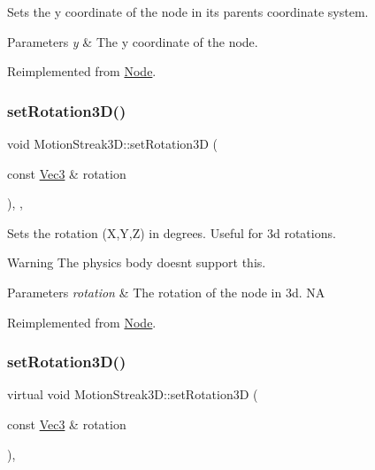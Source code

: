Sets the y coordinate of the node in its parent\textquotesingle{}s coordinate system.


\begin{DoxyParams}{Parameters}
{\em y} & The y coordinate of the node. \\
\hline
\end{DoxyParams}


Reimplemented from \hyperlink{classNode_a5c97d36655f0daa71a5f6c715d2b0470}{Node}.

\mbox{\label{classMotionStreak3D_abe4bc651d6ce068c366edc18cb0aaead}} 
\subsubsection{\texorpdfstring{set\+Rotation3\+D()}{setRotation3D()}\hspace{0.1cm}{\footnotesize\ttfamily [1/2]}}
{\footnotesize\ttfamily void Motion\+Streak3\+D\+::set\+Rotation3D (\begin{DoxyParamCaption}\item[{const \hyperlink{classVec3}{Vec3} \&}]{rotation }\end{DoxyParamCaption})\hspace{0.3cm}{\ttfamily [inline]}, {\ttfamily [override]}, {\ttfamily [virtual]}}

Sets the rotation (X,Y,Z) in degrees. Useful for 3d rotations.

\begin{DoxyWarning}{Warning}
The physics body doesn\textquotesingle{}t support this.
\end{DoxyWarning}

\begin{DoxyParams}{Parameters}
{\em rotation} & The rotation of the node in 3d.  NA \\
\hline
\end{DoxyParams}


Reimplemented from \hyperlink{classNode_a2ce988bebd6c8b804d8bfdfafd511c40}{Node}.

\mbox{\label{classMotionStreak3D_a6ef719a2412711e81c3bfc40ce53c3e2}} 
\subsubsection{\texorpdfstring{set\+Rotation3\+D()}{setRotation3D()}\hspace{0.1cm}{\footnotesize\ttfamily [2/2]}}
{\footnotesize\ttfamily virtual void Motion\+Streak3\+D\+::set\+Rotation3D (\begin{DoxyParamCaption}\item[{const \hyperlink{classVec3}{Vec3} \&}]{rotation }\end{DoxyParamCaption})\hspace{0.3cm}{\ttfamily [override]}, {\ttfamily [virtual]}}

